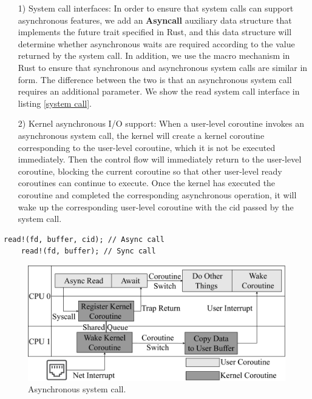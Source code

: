 \documentclass[sigconf,review,anonymous]{acmart}
\begin{document}
\begin{itemize}[leftmargin=*]
    \item[1)] System call interfaces: In order to ensure that system calls can support asynchronous features, we add an \textbf{Asyncall} auxiliary data structure that implements the future trait specified in Rust, and this data structure will determine whether asynchronous waits are required according to the value returned by the system call. In addition, we use the macro mechanism in Rust to ensure that synchronous and asynchronous system calls are similar in form. The difference between the two is that an asynchronous system call requires an additional parameter. We show the read system call interface in listing \ref{system call}.
    \item[2)] Kernel asynchronous I/O support: When a user-level coroutine invokes an asynchronous system call, the kernel will create a kernel coroutine corresponding to the user-level coroutine, which it is not be executed immediately. Then the control flow will immediately return to the user-level coroutine, blocking the current coroutine so that other user-level ready coroutines can continue to execute. Once the kernel has executed the coroutine and completed the corresponding asynchronous operation, it will wake up the corresponding user-level coroutine with the cid passed by the system call. 
\end{itemize}


\begin{lstlisting}[label={system call}, caption={System call interface of read().}]
    read!(fd, buffer, cid); // Async call
    read!(fd, buffer); // Sync call
\end{lstlisting}

\begin{figure}[h]
  \centering
  \includegraphics[width=\linewidth]{assets/async_syscall.pdf}
  \caption{Asynchronous system call.}
  \label{fig:async_syscall}
\end{figure}
\end{document}
